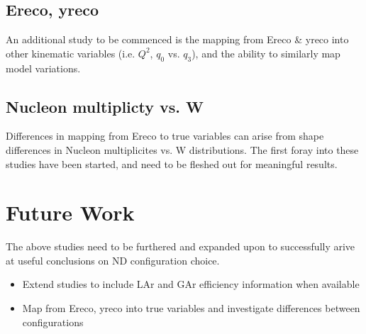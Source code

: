 \documentclass[12pt]{article}
\begin{document}
\subsection{Ereco, yreco}
An additional study to be commenced is the mapping from Ereco \& yreco into other kinematic variables (i.e. $Q^2$, $q_0$ vs. $q_3$), and the ability to similarly map model variations.
\subsection{Nucleon multiplicty vs. W}

Differences in mapping from Ereco to true variables can arise from shape differences in Nucleon multiplicites vs. W distributions. The first foray into these studies have been started, and need to be fleshed out for meaningful results. 

\section{Future Work}\label{sec:Future}

The above studies need to be furthered and expanded upon to successfully arive at useful conclusions on ND configuration choice. 

\begin{itemize}


\item Extend studies to include LAr and GAr efficiency information when available
\item Map from Ereco, yreco into true variables and investigate differences between configurations
\end{itemize}
\end{document}
